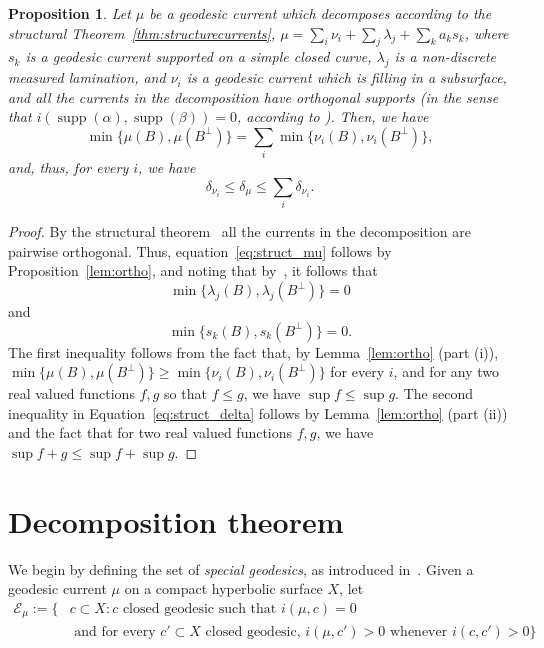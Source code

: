 \documentclass[12pt,article]{amsart}
\numberwithin{equation}{section}
\numberwithin{figure}{section}
\newtheorem{proposition}[equation]{Proposition}
\theoremstyle{definition}
\theoremstyle{plain}
\DeclareMathOperator{\supp}{supp}
\begin{document}
\begin{proposition}
Let $\mu$ be a geodesic current which decomposes according to the structural Theorem~\ref{thm:structurecurrents}, $\mu=\sum_{i}\nu_i + \sum_{j} \lambda_j + \sum_{k} a_k s_k$, where $s_k$ is a geodesic current supported on a simple closed curve, $\lambda_j$ is a non-discrete measured lamination, and $\nu_i$ is a geodesic current which is filling in a subsurface, and all the currents in the decomposition have orthogonal supports (in the sense that $i(\supp(\alpha),\supp(\beta))=0$, according to \cite[Proposition~3.2]{BIPP21:Currents}).
Then, we have
\begin{equation}
\min \{ \mu(B), \mu(B^{\perp})\} = \sum_{i} \min \{ \nu_i(B),\nu_i(B^{\perp})\},
\label{eq:struct_mu}
\end{equation}
and, thus, for every $i$, we have 
\begin{equation}
\delta_{\nu_i} \leq \delta_{\mu} \leq \sum_{i} \delta_{\nu_i}.
\label{eq:struct_delta}
\end{equation}

\label{prop:deltadecomp}
\end{proposition}
\begin{proof}
By the structural theorem~\cite[Proposition~3.2]{BIPP21:Currents} all the currents in the decomposition are pairwise orthogonal. 
Thus, equation~\ref{eq:struct_mu} follows by Proposition~\ref{lem:ortho}, and noting that by~\cite[Proposition~2.1]{BIPP21:Currents}, it follows that
\[\min \{ \lambda_j(B),\lambda_j(B^{\perp}) \}=0\]
and \[\min \{ s_k(B),s_k(B^{\perp}) \}=0.\]
The first inequality follows from the fact that, by Lemma~\ref{lem:ortho} (part (i)), $\min \{ \mu(B), \mu(B^{\perp})\} \geq \min \{ \nu_i(B),\nu_i(B^{\perp})\}$ for every $i$, and for any two real valued functions $f,g$ so that $f \leq g$, we have $\sup f \leq \sup g$.
The second inequality in Equation~\ref{eq:struct_delta} follows by Lemma~\ref{lem:ortho} (part (ii)) and the fact that for two real valued functions $f,g$, we have $\sup f + g \leq \sup f + \sup g$. 
\end{proof}

\section{Decomposition theorem}
\label{sec:decomposition}



We begin by defining the set of \emph{special geodesics}, as introduced in~\cite{BIPP21:Currents}. Given a geodesic current $\mu$ on a compact hyperbolic surface $X$, let
\begin{align*}
 \mathcal{E}_\mu := \{ & c \subset X : c \text{ closed geodesic such that } i(\mu , c ) =0 \\
& \text{ and for every } c' \subset X \text{ closed geodesic, }i(\mu, c') >0 \text{ whenever } i (c, c' ) >0  \}   
\end{align*}
\end{document}
